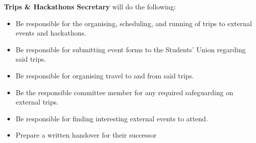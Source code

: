 \begin{subclause}
  \textbf{Trips \& Hackathons Secretary} will do the following: 
  \begin{itemize}[label=--,topsep=0em,itemsep=0em]
    \item Be responsible for the organising, scheduling, and running of trips to external events and hackathons.
    \item Be responsible for submitting event forms to the Students' Union regarding said trips.
    \item Be responsible for organising travel to and from said trips.
    \item Be the responsible committee member for any required safeguarding on external trips.
    \item Be responsible for finding interesting external events to attend.
    \item Prepare a written handover for their successor
  \end{itemize}
\end{subclause}
